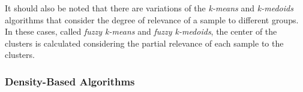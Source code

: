 \documentclass{ieeeaccess}
\begin{document}


It should also be noted that there are variations of the \textit{k-means} and \textit{k-medoids} algorithms that consider the degree of relevance of a sample to different groups. In these cases, called \textit{fuzzy k-means} and \textit{fuzzy k-medoids}, the center of the clusters is calculated considering the partial relevance of each sample to the clusters.


\subsubsection{Density-Based Algorithms}
\label{subsubsec:densidade}
\end{document}
